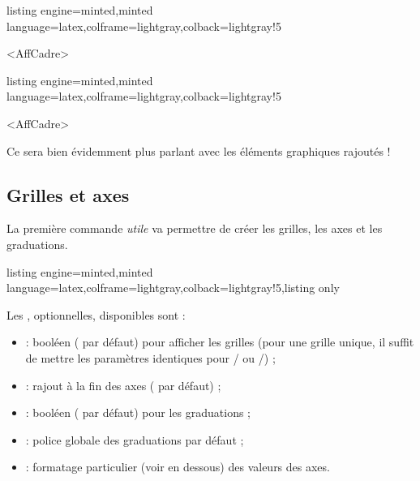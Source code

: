 \documentclass[11pt,a4paper]{ltxdoc}
\begin{document}
\begin{tcblisting}{listing engine=minted,minted language=latex,colframe=lightgray,colback=lightgray!5}
\begin{GraphiqueTikz}
	[x=0.075cm,y=0.03cm,Xmin=0,Xmax=160,Xgrille=20,Xgrilles=10,
	Origy=250,Ymin=250,Ymax=400,Ygrille=25,Ygrilles=5]
	<AffCadre>
\end{GraphiqueTikz}
\end{tcblisting}

\begin{tcblisting}{listing engine=minted,minted language=latex,colframe=lightgray,colback=lightgray!5}
\begin{GraphiqueTikz}%
	[x=0.9cm,y=0.425cm,Xmin=4,Xmax=20,Origx=4,
	Ymin=40,Ymax=56,Ygrille=2,Ygrilles=1,Origy=40]
	<AffCadre>
\end{GraphiqueTikz}
\end{tcblisting}

Ce sera bien évidemment plus parlant avec les éléments graphiques rajoutés !

\pagebreak

\subsection{Grilles et axes}\label{creaaxesgr}

La première commande \textit{utile} va permettre de créer les grilles, les axes et les graduations.

\begin{tcblisting}{listing engine=minted,minted language=latex,colframe=lightgray,colback=lightgray!5,listing only}
\end{tcblisting}

Les \MontreCode{[clés]}, optionnelles, disponibles sont :

\smallskip

\begin{itemize}
	\item {} : booléen ( par défaut) pour afficher les grilles (pour une grille unique, il suffit de mettre les paramètres identiques pour / ou /) ;
	\item {} : rajout à la fin des axes ( par défaut) ;
	\item {} : booléen ( par défaut) pour les graduations ;
	\item {} : police globale des graduations { par défaut} ;
	\item {} : formatage particulier (voir en dessous) des valeurs des axes.
\end{itemize}
\end{document}
